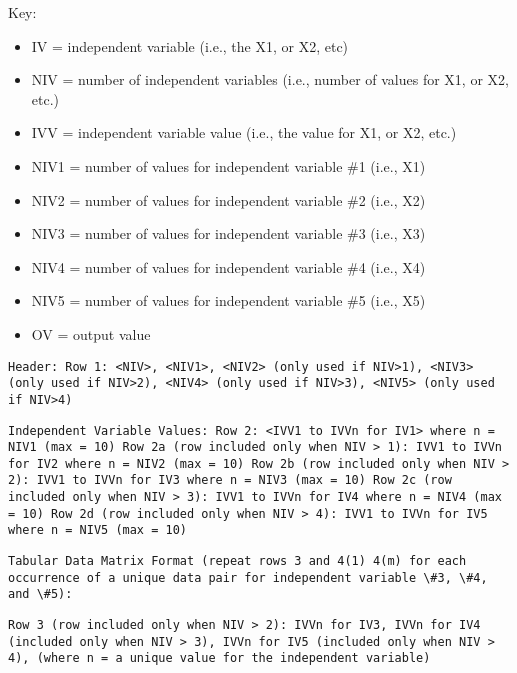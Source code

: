 Key:

\begin{itemize}
\item
  IV = independent variable (i.e., the X1, or X2, etc)
\item
  NIV = number of independent variables (i.e., number of values for X1, or X2, etc.)
\item
  IVV = independent variable value (i.e., the value for X1, or X2, etc.)
\item
  NIV1 = number of values for independent variable \#1 (i.e., X1)
\item
  NIV2 = number of values for independent variable \#2 (i.e., X2)
\item
  NIV3 = number of values for independent variable \#3 (i.e., X3)
\item
  NIV4 = number of values for independent variable \#4 (i.e., X4)
\item
  NIV5 = number of values for independent variable \#5 (i.e., X5)
\item
  OV = output value 
\end{itemize}

\begin{lstlisting}
Header: Row 1: <NIV>, <NIV1>, <NIV2> (only used if NIV>1), <NIV3> (only used if NIV>2), <NIV4> (only used if NIV>3), <NIV5> (only used if NIV>4)
\end{lstlisting}

\begin{lstlisting}
Independent Variable Values: Row 2: <IVV1 to IVVn for IV1> where n = NIV1 (max = 10) Row 2a (row included only when NIV > 1): IVV1 to IVVn for IV2 where n = NIV2 (max = 10) Row 2b (row included only when NIV > 2): IVV1 to IVVn for IV3 where n = NIV3 (max = 10) Row 2c (row included only when NIV > 3): IVV1 to IVVn for IV4 where n = NIV4 (max = 10) Row 2d (row included only when NIV > 4): IVV1 to IVVn for IV5 where n = NIV5 (max = 10)
\end{lstlisting}

\begin{lstlisting}
Tabular Data Matrix Format (repeat rows 3 and 4(1) 4(m) for each occurrence of a unique data pair for independent variable \#3, \#4, and \#5):
\end{lstlisting}

\begin{lstlisting}
Row 3 (row included only when NIV > 2): IVVn for IV3, IVVn for IV4 (included only when NIV > 3), IVVn for IV5 (included only when NIV > 4), (where n = a unique value for the independent variable)
\end{lstlisting}

